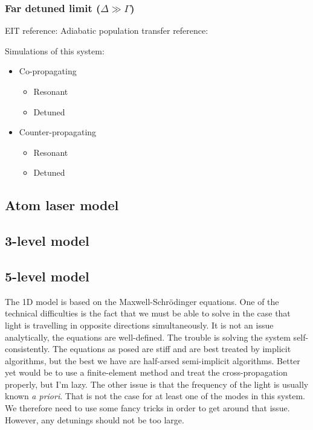 \subsubsection{Far detuned limit ($\Delta \gg \Gamma$)}

EIT reference: \citep{Harris:1990}
Adiabatic population transfer reference: \citep{Kuklinski:1989}

Simulations of this system:
\begin{itemize}
    \item Co-propagating
    \begin{itemize}
        \item Resonant
        \item Detuned
    \end{itemize}
    \item Counter-propagating
    \begin{itemize}
        \item Resonant
        \item Detuned
    \end{itemize}
\end{itemize}

\subsection{Atom laser model}
\label{OpticalPumping:SimpleModels:AtomLaserModel}


\subsection{3-level model}

\subsection{5-level model}
The 1D model is based on the Maxwell-Schrödinger equations.  One of the technical difficulties is the fact that we must be able to solve in the case that light is travelling in opposite directions simultaneously.  It is not an issue analytically, the equations are well-defined.  The trouble is solving the system self-consistently.  The equations as posed are stiff and are best treated by implicit algorithms, but the best we have are half-arsed semi-implicit algorithms. Better yet would be to use a finite-element method and treat the cross-propagation properly, but I'm lazy.  The other issue is that the frequency of the light is usually known \emph{a priori}.  That is not the case for at least one of the modes in this system.  We therefore need to use some fancy tricks in order to get around that issue.  However, any detunings should not be too large.

